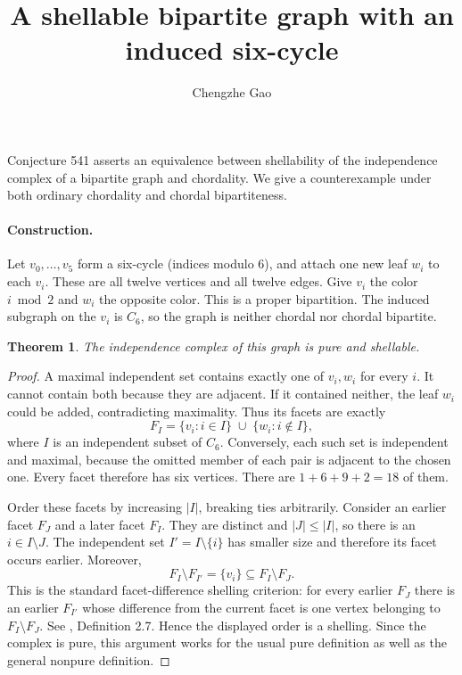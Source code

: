\documentclass[10pt]{article}
\newtheorem{theorem}{Theorem}
\begin{document}
\title{A shellable bipartite graph with an induced six-cycle}
\author{Chengzhe Gao}\date{}\maketitle
Conjecture 541 asserts an equivalence between shellability of the
independence complex of a bipartite graph and chordality. We give a
counterexample under both ordinary chordality and chordal
bipartiteness.

\paragraph{Construction.}
Let $v_0,\ldots,v_5$ form a six-cycle (indices modulo $6$), and attach
one new leaf $w_i$ to each $v_i$. These are all twelve vertices and
all twelve edges. Give $v_i$ the color $i\bmod2$ and $w_i$ the
opposite color. This is a proper bipartition. The induced subgraph
on the $v_i$ is $C_6$, so the graph is neither chordal nor chordal
bipartite.

\begin{theorem}
The independence complex of this graph is pure and shellable.
\end{theorem}
\begin{proof}
A maximal independent set contains exactly one of $v_i,w_i$ for
every $i$. It cannot contain both because they are adjacent. If it
contained neither, the leaf $w_i$ could be added, contradicting
maximality. Thus its facets are exactly
\[
 F_I=\{v_i:i\in I\}\;\cup\;\{w_i:i\notin I\},
\]
where $I$ is an independent subset of $C_6$. Conversely, each such
set is independent and maximal, because the omitted member of each
pair is adjacent to the chosen one. Every facet therefore has six
vertices. There are $1+6+9+2=18$ of them.

Order these facets by increasing $|I|$, breaking ties arbitrarily.
Consider an earlier facet $F_J$ and a later facet $F_I$. They are
distinct and $|J|\leq|I|$, so there is an $i\in I\setminus J$.
The independent set $I'=I\setminus\{i\}$ has smaller size and
therefore its facet occurs earlier. Moreover,
\[
 F_I\setminus F_{I'}=\{v_i\}\subseteq F_I\setminus F_J.
\]
This is the standard facet-difference shelling criterion: for every
earlier $F_J$ there is an earlier $F_{I'}$ whose difference from the
current facet is one vertex belonging to $F_I\setminus F_J$.
See \cite{matching}, Definition 2.7. Hence the displayed order is
a shelling. Since the complex is pure, this argument works for the
usual pure definition as well as the general nonpure definition.
\end{proof}
\end{document}
